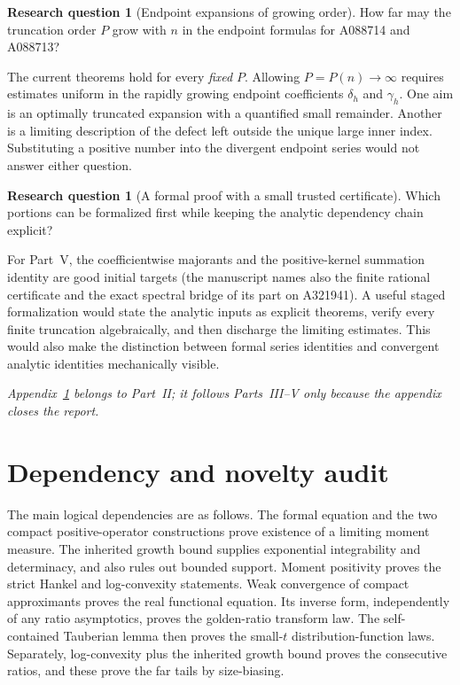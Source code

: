 \documentclass[11pt]{article}
\numberwithin{equation}{section}
\theoremstyle{definition}
\newtheorem{question}[theorem]{Research question}
\theoremstyle{remark}
\begin{document}
\begin{question}[Endpoint expansions of growing order]
How far may the truncation order \(P\) grow with \(n\) in the
endpoint formulas for A088714 and A088713?
\end{question}
The current theorems hold for every \emph{fixed} \(P\).
Allowing \(P=P(n)\to\infty\) requires estimates uniform in the
rapidly growing endpoint coefficients \(\delta_h\) and \(\gamma_h\).
One aim is an optimally truncated expansion with a quantified
small remainder.  Another is a limiting description of the
defect left outside the unique large inner index.  Substituting a
positive number into the divergent endpoint series would not
answer either question.

\begin{question}[A formal proof with a small trusted certificate]
Which portions can be formalized first while keeping the
analytic dependency chain explicit?
\end{question}
For Part~V, the coefficientwise majorants and the positive-kernel
summation identity are good initial targets (the manuscript names also
the finite rational certificate and the exact spectral bridge of its
part on A321941). A useful staged formalization would
state the analytic inputs as explicit theorems, verify every
finite truncation algebraically, and then discharge the limiting
estimates.  This would also make the distinction between formal
series identities and convergent analytic identities mechanically
visible.

\clearpage
\appendix
\noindent\emph{Appendix~\ref{gml:app:audit} belongs to Part~II; it follows Parts~III--V only because the appendix closes the report.}
\section{Dependency and novelty audit}\label{gml:app:audit}
The main logical dependencies are as follows. The formal equation and
the two compact positive-operator constructions prove existence of a
limiting moment measure. The inherited growth bound supplies exponential
integrability and determinacy, and also rules out bounded support.
Moment positivity proves the strict Hankel and log-convexity statements.
Weak convergence of compact approximants proves the real functional
equation. Its inverse form, independently of any ratio asymptotics,
proves the golden-ratio transform law. The self-contained Tauberian lemma
then proves the small-$t$ distribution-function laws. Separately,
log-convexity plus the inherited growth bound proves the consecutive
ratios, and these prove the far tails by size-biasing.
\end{document}
